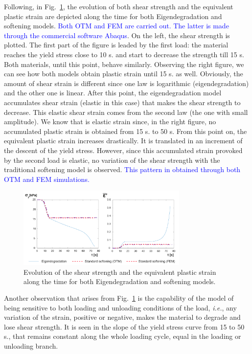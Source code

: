 \documentclass[applsci,journal,article,submit,moreauthors,pdftex]{Definitions/mdpi}
\begin{document}
Following, in Fig.~\ref{fig_VC3}, the evolution of both shear strength and the equivalent plastic strain are depicted along the time for both Eigendegradation and softening models. \textcolor{blue}{Both OTM and FEM are carried out. The latter is made through the commercial software Abaqus}. On the left, the shear strength is plotted. The first part of the figure is leaded by the first load: the material reaches the yield stress close to 10 s. and start to decrease the strength till 15 s. Both materials, until this point, behave similarly. Observing the right figure, we can see how both models obtain plastic strain until 15 s. as well. Obviously, the amount of shear strain is different since one law is logarithmic (eigendegradation) and the other one is linear. After this point, the eigendegradation model accumulates shear strain (elastic in this case) that makes the shear strength to decrease. This elastic shear strain comes from the second law (the one with small amplitude). We know that is elastic strain since, in the right figure, no accumulated plastic strain is obtained from 15 s. to 50 s. From this point on, the equivalent plastic strain increases drastically. It is translated in an increment of the descent of the yield stress. However, since this accumulated strain provoked by the second load is elastic, no variation of the shear strength with the traditional softening model is observed. \textcolor{blue}{This pattern in obtained through both OTM and FEM simulations.}

\begin{figure}
\centering
\includegraphics[width=0.75\textwidth]{Figs/evo_VC.pdf}
\caption{Evolution of the shear strength and the equivalent plastic strain along the time for both Eigendegradation and softening models.}
\label{fig_VC3}
\end{figure}

Another observation that arises from Fig.~\ref{fig_VC3} is the capability of the model of being sensitive to both loading and unloading conditions of the load, \textit{i.e.}, any variation of the strain, positive or negative, makes the material to degrade and lose shear strength. It is seen in the slope of the yield stress curve from 15 to 50 s., that remains constant along the whole loading cycle, equal in the loading or unloading branch.
\end{document}
